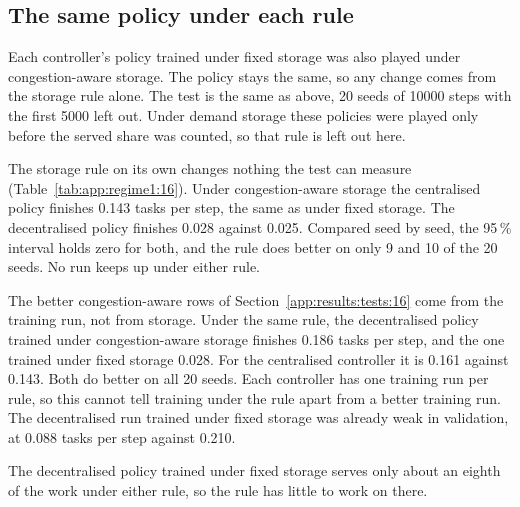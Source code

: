 \subsection{The same policy under each rule}
\label{app:results:regime1}

Each controller's policy trained under fixed storage was also played under congestion-aware storage. The
policy stays the same, so any change comes from the storage rule alone. The test is the same as
above, 20 seeds of 10000 steps with the first 5000 left out. Under demand storage these policies were
played only before the served share was counted, so that rule is left out here.

The storage rule on its own changes nothing the test can measure (Table~\ref{tab:app:regime1:16}).
Under congestion-aware storage the centralised policy finishes 0.143 tasks per step, the same as
under fixed storage. The decentralised policy finishes 0.028 against 0.025. Compared seed by seed,
the 95\,\% interval holds zero for both, and the rule does better on only 9 and 10 of the 20 seeds.
No run keeps up under either rule.

The better congestion-aware rows of Section~\ref{app:results:tests:16} come from the training run,
not from storage. Under the same rule, the decentralised policy trained under congestion-aware
storage finishes 0.186 tasks per step, and the one trained under fixed storage 0.028. For the
centralised controller it is 0.161 against 0.143. Both do better on all 20 seeds. Each controller has one training
run per rule, so this cannot tell training under the rule apart from a better training run. The
decentralised run trained under fixed storage was already weak in validation, at 0.088 tasks per step %
against 0.210.

The decentralised policy trained under fixed storage serves only about an eighth of the work under
either rule, so the rule has little to work on there.

